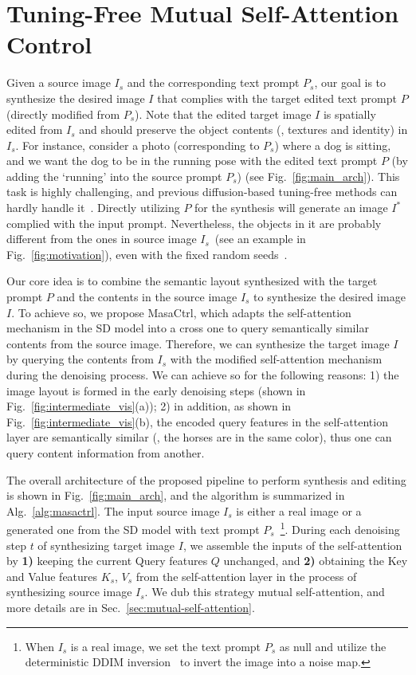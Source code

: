 \documentclass[10pt,twocolumn,letterpaper]{article}
\begin{document}
\section{Tuning-Free Mutual Self-Attention Control}
Given a source image $I_s$ and the corresponding text prompt $P_s$, our goal is to synthesize the desired image $I$ that complies with the target edited text prompt $P$ (directly modified from $P_s$). Note that the edited target image $I$ is spatially edited from $I_s$ and should preserve the object contents (\eg, textures and identity) in $I_s$. For instance, consider a photo (corresponding to $P_s$) where a dog is sitting, and we want the dog to be in the running pose with the edited text prompt $P$ (by adding the `running' into the source prompt $P_s$) (see Fig.~\ref{fig:main_arch}). This task is highly challenging, and previous diffusion-based tuning-free methods can hardly handle it~\cite{hertz2022prompt, tumanyan2022plug}. Directly utilizing $P$ for the synthesis will generate an image $I^*$ complied with the input prompt. Nevertheless, the objects in it are probably different from the ones in source image $I_s$~(see an example in Fig.~\ref{fig:motivation}), even with the fixed random seeds~\cite{hertz2022prompt}. 

Our core idea is to combine the semantic layout synthesized with the target prompt $P$ and the contents in the source image $I_s$ to synthesize the desired image $I$. 
To achieve so, we propose MasaCtrl, which adapts the self-attention mechanism in the SD model into a cross one to query semantically similar contents from the source image. Therefore, we can synthesize the target image $I$ by querying the contents from $I_s$ with the modified self-attention mechanism during the denoising process. We can achieve so for the following reasons: 1) the image layout is formed in the early denoising steps (shown in Fig.~\ref{fig:intermediate_vis}(a)); 2) in addition, as shown in Fig.~\ref{fig:intermediate_vis}(b), the encoded query features in the self-attention layer are semantically similar (\eg, the horses are in the same color), thus one can query content information from another.


The overall architecture of the proposed pipeline to perform synthesis and editing is shown in Fig.~\ref{fig:main_arch}, and the algorithm is summarized in Alg.~\ref{alg:masactrl}. The input source image $I_s$ is either a real image or a generated one from the SD model with text prompt $P_s$~\footnote{When $I_s$ is a real image, we set the text prompt $P_s$ as null and utilize the deterministic DDIM inversion~\cite{song2020denoising} to invert the image into a noise map.}. During each denoising step $t$ of synthesizing target image $I$, we assemble the inputs of the self-attention by \textbf{1)} keeping the current Query features $Q$ unchanged, and \textbf{2)} obtaining the Key and Value features $K_s$, $V_s$ from the self-attention layer in the process of synthesizing source image $I_s$. We dub this strategy mutual self-attention, and more details are in Sec.~\ref{sec:mutual-self-attention}.
\end{document}
